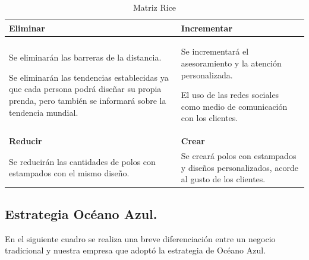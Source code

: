 \documentclass[a4paper,openright,12pt]{book}
\begin{document}
\begin{table}[H] %
\centering
\begin{tabular}{p{8cm}p{8cm}}
\hline
\textbf{Eliminar}                                                         & \textbf{Incrementar}                            \\
\hline %
Se eliminarán las barreras de la distancia.

Se eliminarán las tendencias establecidas ya que cada persona podrá diseñar su propia prenda, pero también se informará sobre la tendencia mundial.
                                                                          &     Se incrementará el asesoramiento y la atención personalizada.

El uso de las redes sociales como medio de comunicación con los clientes.                                                    \\
\hline
\textbf{Reducir}                                                          & \textbf{Crear}                                    \\
\hline 
Se reducirán las cantidades de polos con estampados con el mismo diseño.   &  Se creará polos con estampados y diseños personalizados, acorde al gusto de los clientes.                                                                                                                 \\
\hline
\end{tabular}
\caption{Matriz Rice}
\label{Tabla1}
\end{table}

\subsection{Estrategia Océano Azul.}
En el siguiente cuadro se realiza una breve diferenciación entre un negocio tradicional y nuestra empresa que adoptó la estrategia de Océano Azul.
\end{document}
